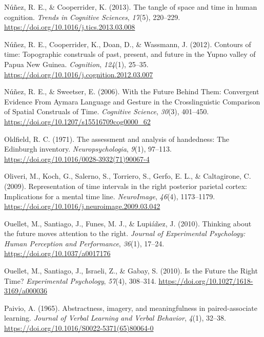 \documentclass[
  a4paper,12pt,twoside,onecolumn,openright,final,oldfontcommands]{memoir}
\newlength{\cslhangindent}
\newlength{\cslentryspacingunit} %
\newenvironment{CSLReferences}[2] %
 {%
  \setlength{\parindent}{0pt}
  \ifodd #1
  \let\oldpar\par
  \def\par{\hangindent=\cslhangindent\oldpar}
  \fi
  \setlength{\parskip}{#2\cslentryspacingunit}
 }%
 {}
\begin{document}
\begin{CSLReferences}{1}{0}
\leavevmode{}%
Núñez, R. E., \& Cooperrider, K. (2013). The tangle of space and time in human cognition. \emph{Trends in Cognitive Sciences}, \emph{17}(5), 220--229. \url{https://doi.org/10.1016/j.tics.2013.03.008}

\leavevmode{}%
Núñez, R. E., Cooperrider, K., Doan, D., \& Wassmann, J. (2012). Contours of time: {Topographic} construals of past, present, and future in the {Yupno} valley of {Papua} {New} {Guinea}. \emph{Cognition}, \emph{124}(1), 25--35. \url{https://doi.org/10.1016/j.cognition.2012.03.007}

\leavevmode{}%
Núñez, R. E., \& Sweetser, E. (2006). With the {Future} {Behind} {Them}: {Convergent} {Evidence} {From} {Aymara} {Language} and {Gesture} in the {Crosslinguistic} {Comparison} of {Spatial} {Construals} of {Time}. \emph{Cognitive Science}, \emph{30}(3), 401--450. \url{https://doi.org/10.1207/s15516709cog0000_62}

\leavevmode{}%
Oldfield, R. C. (1971). The assessment and analysis of handedness: {The} {Edinburgh} inventory. \emph{Neuropsychologia}, \emph{9}(1), 97--113. \url{https://doi.org/10.1016/0028-3932(71)90067-4}

\leavevmode{}%
Oliveri, M., Koch, G., Salerno, S., Torriero, S., Gerfo, E. L., \& Caltagirone, C. (2009). Representation of time intervals in the right posterior parietal cortex: {Implications} for a mental time line. \emph{NeuroImage}, \emph{46}(4), 1173--1179. \url{https://doi.org/10.1016/j.neuroimage.2009.03.042}

\leavevmode{}%
Ouellet, M., Santiago, J., Funes, M. J., \& Lupiáñez, J. (2010). Thinking about the future moves attention to the right. \emph{Journal of Experimental Psychology: Human Perception and Performance}, \emph{36}(1), 17--24. \url{https://doi.org/10.1037/a0017176}

\leavevmode{}%
Ouellet, M., Santiago, J., Israeli, Z., \& Gabay, S. (2010). Is the {Future} the {Right} {Time}? \emph{Experimental Psychology}, \emph{57}(4), 308--314. \url{https://doi.org/10.1027/1618-3169/a000036}

\leavevmode{}%
Paivio, A. (1965). Abstractness, imagery, and meaningfulness in paired-associate learning. \emph{Journal of Verbal Learning and Verbal Behavior}, \emph{4}(1), 32--38. \url{https://doi.org/10.1016/S0022-5371(65)80064-0}


\end{CSLReferences}
\end{document}
